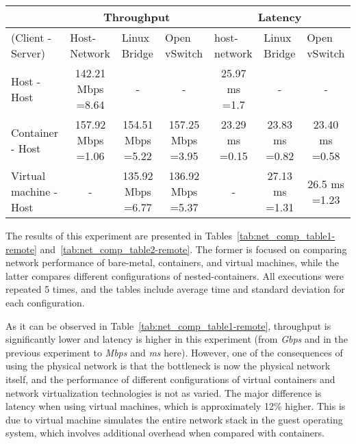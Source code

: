 \documentclass[conference]{IEEEtran}
\begin{document}
\begin{table*}
\renewcommand{\arraystretch}{1.3}
\centering
\caption{Network throughput and latency evaluation for different
    configurations of client/server under bare-metal, container
and virtual machine across two hosts}
\begin{tabular}{|l|c|c|c||c|c|c|}
\hline
& \multicolumn{3}{c||}{Throughput} & \multicolumn{3}{c|}{Latency}                                                                \\ \hline
(Client - Server) & \multicolumn{1}{l|}{Host-Network} & \multicolumn{1}{l|}{Linux Bridge } & \multicolumn{1}{l||}{Open vSwitch} & \multicolumn{1}{l|}{host-network} & \multicolumn{1}{l|}{Linux Bridge } & \multicolumn{1}{l|}{Open vSwitch}  \\ \hline
\hline
Host - Host            & 142.21 Mbps =8.64 & -                        & -                        & 25.97 ms	=1.7 & -                     & -                  \\ \hline
Container - Host       & 157.92 Mbps =1.06 & 154.51 Mbps =5.22& 157.25 Mbps =3.95& 23.29 ms =0.15& 23.83 ms =0.82& 23.40 ms	=0.58\\\hline
Virtual machine - Host & - 						   &135.92 Mbps =6.77 & 136.92 Mbps =5.37& - 	                 & 27.13 ms =1.31& 26.5 ms =1.23\\\hline
\end{tabular}
\label{tab:net_comp_table1-remote}
\end{table*}

The results of this experiment are presented in
Tables~\ref{tab:net_comp_table1-remote} and~\ref{tab:net_comp_table2-remote}.
The former is focused on comparing network performance of bare-metal,
containers, and virtual machines, while the latter compares different
configurations of nested-containers.  All executions were repeated
5 times, and the tables include average time and standard deviation for each
configuration.



As it can be observed in Table~\ref{tab:net_comp_table1-remote}, throughput is
significantly lower and latency is higher in this experiment (from \textit{Gbps}
and \textit{} in the previous experiment to \textit{Mbps} and
\textit{ms} here). However, one of the consequences of using the physical
network is that the bottleneck is now the physical network itself, and the
performance of different configurations of virtual containers and network
virtualization technologies is not as varied. The major difference is
latency when using virtual machines, which is approximately 12\% higher.  This
is due to virtual machine simulates the entire network stack in the guest
operating system, which involves additional overhead when compared with
containers.
\end{document}
